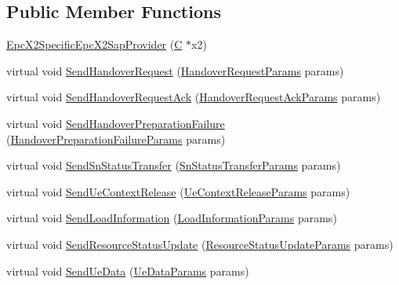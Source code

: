 \subsection*{Public Member Functions}
\begin{DoxyCompactItemize}
\item 
\hyperlink{classns3_1_1EpcX2SpecificEpcX2SapProvider_ae02cf581402bd73c71583dba95d7422f}{Epc\+X2\+Specific\+Epc\+X2\+Sap\+Provider} (\hyperlink{loss__COST231__small__cities__urban_8m_aaa53ca0b650dfd85c4f59fa156f7a2cc}{C} $\ast$x2)
\item 
virtual void \hyperlink{classns3_1_1EpcX2SpecificEpcX2SapProvider_a249924ca86519b1e2f7ddd939ab1c8b8}{Send\+Handover\+Request} (\hyperlink{structns3_1_1EpcX2Sap_1_1HandoverRequestParams}{Handover\+Request\+Params} params)
\item 
virtual void \hyperlink{classns3_1_1EpcX2SpecificEpcX2SapProvider_a64ae0fcbfc7992b1aa5a4dfcdb3d67dd}{Send\+Handover\+Request\+Ack} (\hyperlink{structns3_1_1EpcX2Sap_1_1HandoverRequestAckParams}{Handover\+Request\+Ack\+Params} params)
\item 
virtual void \hyperlink{classns3_1_1EpcX2SpecificEpcX2SapProvider_ad5e951a375fbe0b6da5f74b45ad5b158}{Send\+Handover\+Preparation\+Failure} (\hyperlink{structns3_1_1EpcX2Sap_1_1HandoverPreparationFailureParams}{Handover\+Preparation\+Failure\+Params} params)
\item 
virtual void \hyperlink{classns3_1_1EpcX2SpecificEpcX2SapProvider_abf206578b77aa4145895b24fefba9470}{Send\+Sn\+Status\+Transfer} (\hyperlink{structns3_1_1EpcX2Sap_1_1SnStatusTransferParams}{Sn\+Status\+Transfer\+Params} params)
\item 
virtual void \hyperlink{classns3_1_1EpcX2SpecificEpcX2SapProvider_ae05ac5723de96dc8e7603b137ac73c70}{Send\+Ue\+Context\+Release} (\hyperlink{structns3_1_1EpcX2Sap_1_1UeContextReleaseParams}{Ue\+Context\+Release\+Params} params)
\item 
virtual void \hyperlink{classns3_1_1EpcX2SpecificEpcX2SapProvider_a11fe02e2713a0db441242c2d40ddf3a8}{Send\+Load\+Information} (\hyperlink{structns3_1_1EpcX2Sap_1_1LoadInformationParams}{Load\+Information\+Params} params)
\item 
virtual void \hyperlink{classns3_1_1EpcX2SpecificEpcX2SapProvider_a72aa333026e1d8a0e7b88cf87d620af4}{Send\+Resource\+Status\+Update} (\hyperlink{structns3_1_1EpcX2Sap_1_1ResourceStatusUpdateParams}{Resource\+Status\+Update\+Params} params)
\item 
virtual void \hyperlink{classns3_1_1EpcX2SpecificEpcX2SapProvider_a6d548ae8f7fc50f78a2752b8c62bfd55}{Send\+Ue\+Data} (\hyperlink{structns3_1_1EpcX2Sap_1_1UeDataParams}{Ue\+Data\+Params} params)

\end{DoxyCompactItemize}

